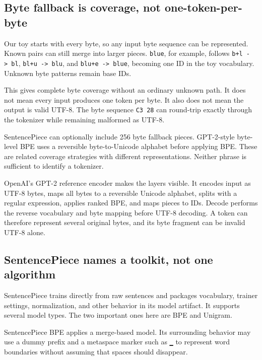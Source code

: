\documentclass[
  10pt,
]{article}
\begin{document}
\subsection{Byte fallback is coverage, not
one-token-per-byte}\label{byte-fallback-is-coverage-not-one-token-per-byte}

Our toy starts with every byte, so any input byte sequence can be
represented. Known pairs can still merge into larger pieces.
\texttt{blue}, for example, follows \texttt{b+l\ -\textgreater{}\ bl},
\texttt{bl+u\ -\textgreater{}\ blu}, and
\texttt{blu+e\ -\textgreater{}\ blue}, becoming one ID in the toy
vocabulary. Unknown byte patterns remain base IDs.

This gives complete byte coverage without an ordinary unknown path. It
does not mean every input produces one token per byte. It also does not
mean the output is valid UTF-8. The byte sequence \texttt{C3\ 28} can
round-trip exactly through the tokenizer while remaining malformed as
UTF-8.

SentencePiece can optionally include 256 byte fallback pieces.
GPT-2-style byte-level BPE uses a reversible byte-to-Unicode alphabet
before applying BPE. These are related coverage strategies with
different representations. Neither phrase is sufficient to identify a
tokenizer.

OpenAI's GPT-2 reference encoder makes the layers visible. It encodes
input as UTF-8 bytes, maps all bytes to a reversible Unicode alphabet,
splits with a regular expression, applies ranked BPE, and maps pieces to
IDs. Decode performs the reverse vocabulary and byte mapping before
UTF-8 decoding. A token can therefore represent several original bytes,
and its byte fragment can be invalid UTF-8 alone.

\subsection{SentencePiece names a toolkit, not one
algorithm}\label{sentencepiece-names-a-toolkit-not-one-algorithm}

SentencePiece trains directly from raw sentences and packages
vocabulary, trainer settings, normalization, and other behavior in its
model artifact. It supports several model types. The two important ones
here are BPE and Unigram.

SentencePiece BPE applies a merge-based model. Its surrounding behavior
may use a dummy prefix and a metaspace marker such as \texttt{▁} to
represent word boundaries without assuming that spaces should disappear.
\end{document}
